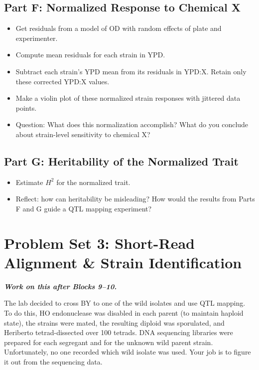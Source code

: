 \subsection{Part F: Normalized Response to Chemical X}

\begin{dobox}[Tasks]
\begin{itemize}[nosep]
  \item Get residuals from a model of OD with random effects of plate and experimenter.
  \item Compute mean residuals for each strain in YPD.
  \item Subtract each strain's YPD mean from its residuals in YPD:X. Retain only these corrected YPD:X values.
  \item Make a violin plot of these normalized strain responses with jittered data points.
  \item Question: What does this normalization accomplish? What do you conclude about strain-level sensitivity to chemical X?
\end{itemize}
\end{dobox}

\subsection{Part G: Heritability of the Normalized Trait}

\begin{dobox}[Tasks]
\begin{itemize}[nosep]
  \item Estimate $H^2$ for the normalized trait.
  \item Reflect: how can heritability be misleading? How would the results from Parts F and G guide a QTL mapping experiment?
\end{itemize}
\end{dobox}


\section{Problem Set 3: Short-Read Alignment \& Strain Identification}\label{ps:3}

\textit{\textbf{Work on this after Blocks 9--10.}}

The lab decided to cross BY to one of the wild isolates and use QTL mapping. To do this, HO endonuclease was disabled in each parent (to maintain haploid state), the strains were mated, the resulting diploid was sporulated, and Heriberto tetrad-dissected over 100 tetrads. DNA sequencing libraries were prepared for each segregant and for the unknown wild parent strain. Unfortunately, no one recorded which wild isolate was used. Your job is to figure it out from the sequencing data.

